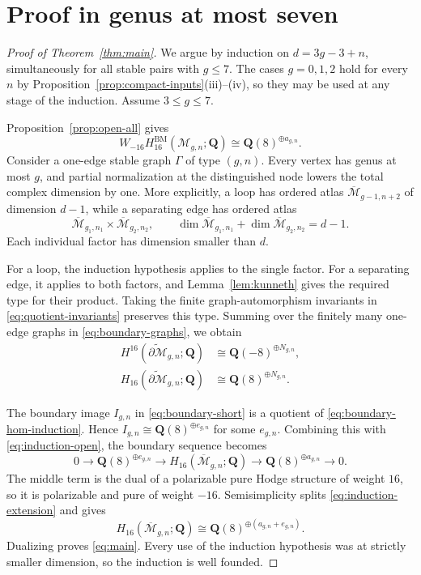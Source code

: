 \documentclass[12pt,reqno]{amsart}
\newcommand{\Q}{\mathbf{Q}}
\newcommand{\M}{\mathcal{M}}
\newcommand{\Mbar}{\overline{\mathcal{M}}}
\newcommand{\BM}{\mathrm{BM}}
\theoremstyle{definition}
\theoremstyle{remark}
\begin{document}
\section{Proof in genus at most seven}
\label{sec:induction}

\begin{proof}[Proof of Theorem~\ref{thm:main}]
We argue by induction on $d=3g-3+n$, simultaneously for all stable pairs
with $g\leq7$.  The cases $g=0,1,2$ hold for every $n$ by
Proposition~\ref{prop:compact-inputs}(iii)--(iv), so they may be used at any
stage of the induction.  Assume $3\leq g\leq7$.

Proposition~\ref{prop:open-all} gives
\begin{equation}\label{eq:induction-open}
 W_{-16}H_{16}^{\BM}(\M_{g,n};\Q)
 \cong\Q(8)^{\oplus a_{g,n}}.
\end{equation}
Consider a one-edge stable graph $\Gamma$ of type $(g,n)$.  Every vertex
has genus at most $g$, and partial normalization at the distinguished node
lowers the total complex dimension by one.  More explicitly, a loop has
ordered atlas $\Mbar_{g-1,n+2}$ of dimension $d-1$, while a separating edge
has ordered atlas
\[
 \Mbar_{g_1,n_1}\times\Mbar_{g_2,n_2},
 \qquad
 \dim\Mbar_{g_1,n_1}+\dim\Mbar_{g_2,n_2}=d-1.
\]
Each individual factor has dimension smaller than $d$.

For a loop, the induction hypothesis applies to the single factor.  For a
separating edge, it applies to both factors, and
Lemma~\ref{lem:kunneth} gives the required type for their product.  Taking
the finite graph-automorphism invariants in
\eqref{eq:quotient-invariants} preserves this type.  Summing over the
finitely many one-edge graphs in \eqref{eq:boundary-graphs}, we obtain
\begin{align}
 H^{16}(\widetilde{\partial\M}_{g,n};\Q)
   &\cong\Q(-8)^{\oplus N_{g,n}},
   \label{eq:boundary-cohom-induction}\\
 H_{16}(\widetilde{\partial\M}_{g,n};\Q)
   &\cong\Q(8)^{\oplus N_{g,n}}.
   \label{eq:boundary-hom-induction}
\end{align}

The boundary image $I_{g,n}$ in \eqref{eq:boundary-short} is a quotient of
\eqref{eq:boundary-hom-induction}.  Hence
$I_{g,n}\cong\Q(8)^{\oplus e_{g,n}}$ for some $e_{g,n}$.  Combining this
with \eqref{eq:induction-open}, the boundary sequence becomes
\begin{equation}\label{eq:induction-extension}
 0\longrightarrow\Q(8)^{\oplus e_{g,n}}
 \longrightarrow H_{16}(\Mbar_{g,n};\Q)
 \longrightarrow\Q(8)^{\oplus a_{g,n}}
 \longrightarrow0.
\end{equation}
The middle term is the dual of a polarizable pure Hodge structure of weight
$16$, so it is polarizable and pure of weight $-16$.  Semisimplicity splits
\eqref{eq:induction-extension} and gives
\[
 H_{16}(\Mbar_{g,n};\Q)
 \cong\Q(8)^{\oplus(a_{g,n}+e_{g,n})}.
\]
Dualizing proves \eqref{eq:main}.  Every use of the induction hypothesis was
at strictly smaller dimension, so the induction is well founded.
\end{proof}
\end{document}

